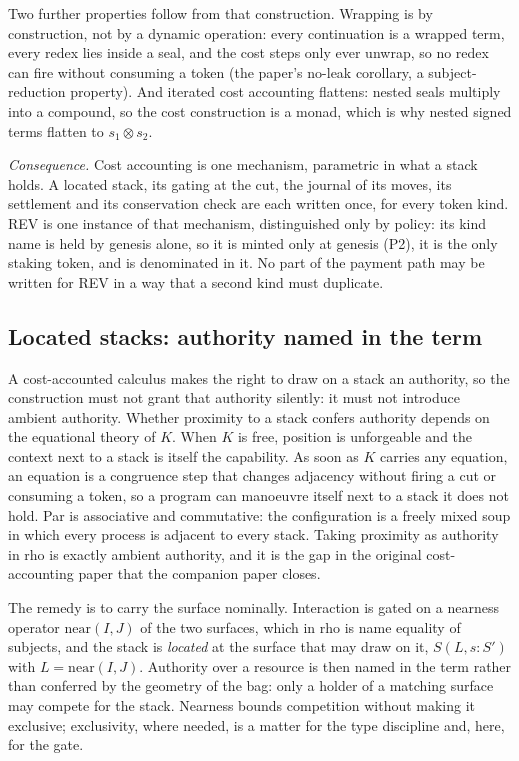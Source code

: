 \documentclass[11pt]{article}
\newcommand{\code}{\path}
\begin{document}
Two further properties follow from that construction. Wrapping is by construction, not by a dynamic operation: every continuation is a wrapped term, every redex lies inside a seal, and the cost steps only ever unwrap, so no redex can fire without consuming a token (the paper's no-leak corollary, a subject-reduction property). And iterated cost accounting flattens: nested seals multiply into a compound, so the cost construction is a monad, which is why nested signed terms flatten to $s_1 \otimes s_2$.

\emph{Consequence.} Cost accounting is one mechanism, parametric in what a stack holds. A located stack, its gating at the cut, the journal of its moves, its settlement and its conservation check are each written once, for every token kind. REV is one instance of that mechanism, distinguished only by policy: its kind name is held by genesis alone, so it is minted only at genesis (P2), it is the only staking token, and \code{phloPrice} is denominated in it. No part of the payment path may be written for REV in a way that a second kind must duplicate.

\subsection{Located stacks: authority named in the term}\label{sec:located}

A cost-accounted calculus makes the right to draw on a stack an authority, so the construction must not grant that authority silently: it must not introduce ambient authority. Whether proximity to a stack confers authority depends on the equational theory of $K$. When $K$ is free, position is unforgeable and the context next to a stack is itself the capability. As soon as $K$ carries any equation, an equation is a congruence step that changes adjacency without firing a cut or consuming a token, so a program can manoeuvre itself next to a stack it does not hold. Par is associative and commutative: the configuration is a freely mixed soup in which every process is adjacent to every stack. Taking proximity as authority in rho is exactly ambient authority, and it is the gap in the original cost-accounting paper that the companion paper closes.

The remedy is to carry the surface nominally. Interaction is gated on a nearness operator $\mathrm{near}(I,J)$ of the two surfaces, which in rho is name equality of subjects, and the stack is \emph{located} at the surface that may draw on it, $S(L, s : S')$ with $L = \mathrm{near}(I,J)$. Authority over a resource is then named in the term rather than conferred by the geometry of the bag: only a holder of a matching surface may compete for the stack. Nearness bounds competition without making it exclusive; exclusivity, where needed, is a matter for the type discipline and, here, for the gate.
\end{document}
